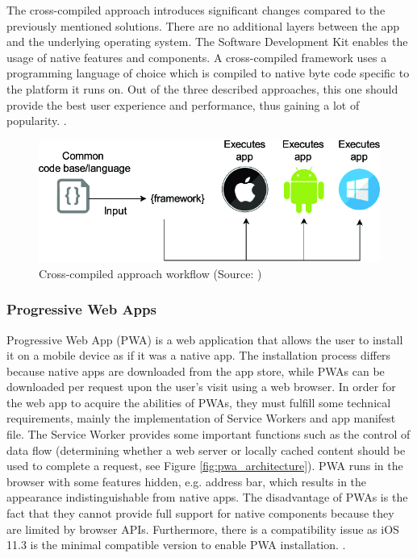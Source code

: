 The cross-compiled approach introduces significant changes compared to the previously mentioned solutions. There are no additional layers between the app and the underlying operating system. The Software Development Kit enables the usage of native features and components. A cross-compiled framework uses a programming language of choice which is compiled to native byte code specific to the platform it runs on. Out of the three described approaches, this one should provide the best user experience and performance, thus gaining a lot of popularity.  \cite{survey_taxonomy_cross_platform,comparison_technologies_multiplatform,cross_platform_development_study_rn_flutter,eval_rn_flutter}.

\begin{figure}[h]
	\centering
	\includegraphics[width=.63\textwidth]{img/cross_compiled}
	\caption{Cross-compiled approach workflow (Source: \cite{survey_taxonomy_cross_platform})}
	\label{fig:cross_compiled_workflow}
\end{figure}

\subsubsection*{Progressive Web Apps}

Progressive Web App (PWA) is a web application that allows the user to install it on a mobile device as if it was a native app. The installation process differs because native apps are downloaded from the app store, while PWAs can be downloaded per request upon the user's visit using a web browser. In order for the web app to acquire the abilities of PWAs, they must fulfill some technical requirements, mainly the implementation of Service Workers and app manifest file. The Service Worker provides some important functions such as the control of data flow (determining whether a web server or locally cached content should be used to complete a request, see Figure \ref{fig:pwa_architecture}). PWA runs in the browser with some features hidden, e.g. address bar, which results in the appearance indistinguishable from native apps. The disadvantage of PWAs is the fact that they cannot provide full support for native components because they are limited by browser APIs. Furthermore, there is a compatibility issue as iOS 11.3 is the minimal compatible version to enable PWA installation.
\cite{survey_taxonomy_cross_platform,comparison_technologies_multiplatform,eval_rn_flutter}.

